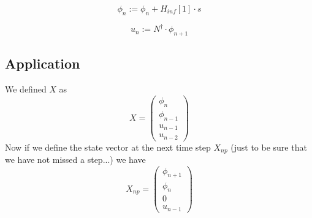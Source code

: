 \documentclass[a4,10pt]{article}
\begin{document}
\begin{equation}
\phi_n := \phi_n + H_{inf}[1] \cdot s
\end{equation}

\begin{equation}
u_{n} := N^{\dag} \cdot \phi_{n+1}
\label{eq:ur}
\end{equation}


\subsection{Application}

We defined $X$ as
\begin{equation*}
X=\begin{pmatrix}
\phi_n\\
\phi_{n-1}\\
u_{n-1}\\
u_{n-2}\end{pmatrix}
\end{equation*}
Now if we define the state vector at the next time step $X_{np}$ (just to be sure that we have not missed a step...) we have
\begin{equation*}
X_{np}=\begin{pmatrix}
\phi_{n+1}\\
\phi_{n}\\
0\\
u_{n-1}\end{pmatrix}
\end{equation*}
\end{document}
